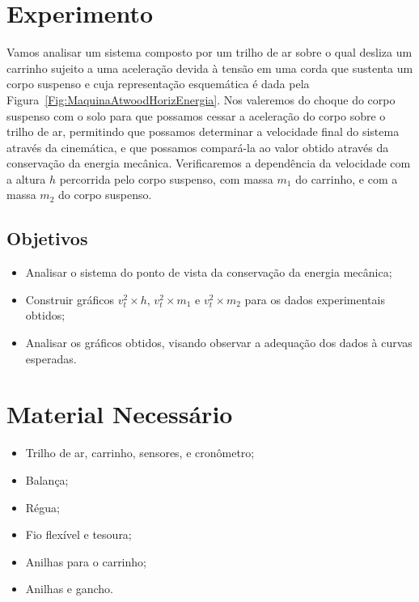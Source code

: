 \section{Experimento}

Vamos analisar um sistema composto por um trilho de ar sobre o qual desliza um carrinho sujeito a uma aceleração devida à tensão em uma corda que sustenta um corpo suspenso e cuja representação esquemática é dada pela Figura~\ref{Fig:MaquinaAtwoodHorizEnergia}. Nos valeremos do choque do corpo suspenso com o solo para que possamos cessar a aceleração do corpo sobre o trilho de ar, permitindo que possamos determinar a velocidade final do sistema através da cinemática, e que possamos compará-la ao valor obtido através da conservação da energia mecânica. Verificaremos a dependência da velocidade com a altura $h$ percorrida pelo corpo suspenso, com massa $m_1$ do carrinho, e com a massa $m_2$ do corpo suspenso.

\subsection{Objetivos}

\begin{itemize}
	\item Analisar o sistema do ponto de vista da conservação da energia mecânica;
	\item Construir gráficos $v_t^2 \times h$, $v_t^2 \times m_1$ e $v_t^2 \times m_2$ para os dados experimentais obtidos;
	\item Analisar os gráficos obtidos, visando observar a adequação dos dados à curvas esperadas.
\end{itemize}

\section{Material Necessário}

\begin{itemize}
	\item Trilho de ar, carrinho, sensores, e cronômetro;
	\item Balança;
	\item Régua;
	\item Fio flexível e tesoura;
	\item Anilhas para o carrinho;
	\item Anilhas e gancho.
\end{itemize}

